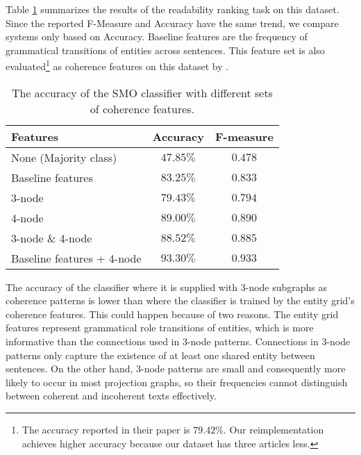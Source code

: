 Table \ref{tab:ranking-pitler} summarizes the results of the readability ranking task on this dataset. 
Since the reported F-Measure and Accuracy have the same trend, we compare systems only based on Accuracy.  
Baseline features are the frequency of grammatical transitions of entities across sentences. 
This feature set is also evaluated\footnote{The accuracy reported in their paper is $79.42\%$. Our reimplementation achieves higher accuracy because our dataset has three articles less.} as coherence features on this dataset by .

\begin{table}[!ht]
	\begin{center}
		\begin{tabular}{lcc}
			\toprule
			\textbf{Features} 						  & \textbf{Accuracy}		& \textbf{F-measure}	\\
			\midrule
			None (Majority class) 			  & $47.85\%$		& $0.478$		\\
			Baseline features 			  	  & $83.25\%$     	& $0.833$		\\
			3-node 							  & $79.43\%$		& $0.794$		\\
			4-node 						      & $89.00\%$		& $0.890$		\\
			3-node \& 4-node 				  & $88.52\%$		& $0.885$		\\
			Baseline features + 4-node 				  & $93.30\%$		& $0.933$		\\
			\bottomrule
		\end{tabular}
	\end{center}
	\caption{The accuracy of the SMO classifier with different sets of coherence features.}
	\label{tab:ranking-pitler}
\end{table}

The accuracy of the classifier where it is supplied with 3-node subgraphs as coherence patterns is lower than where the classifier is trained  by the entity grid's coherence features.   
This could happen because of two reasons. 
The entity grid features represent grammatical role transitions of entities, which is more informative than the connections used in 3-node patterns.
Connections in 3-node patterns only capture the existence of at least one shared entity between sentences. 
On the other hand, 3-node patterns are small and consequently more likely to occur in most projection graphs, so their frequencies cannot distinguish between coherent and incoherent texts effectively. 

